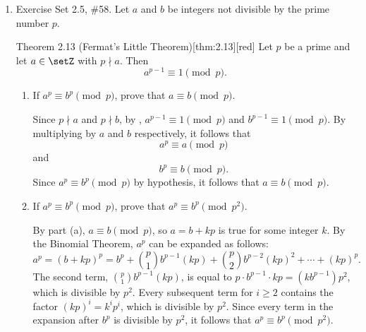 \begin{enumerate}
  \item Exercise Set 2.5, \#58.
  Let $a$ and $b$ be integers not divisible by the prime number $p$.
  \begin{define}{Theorem 2.13 (Fermat's Little Theorem)}[thm:2.13][red]
  Let $p$ be a prime and let $a\in\setZ$ with $p\nmid a$. Then
  \[
  a^{p-1}\equiv 1\pmod{p}.
  \]
  \end{define}
  \begin{enumerate}
    \item If $a^p \equiv b^p \pmod{p}$, prove that $a \equiv b \pmod{p}$. \label{prob:2.5.58a}
    \begin{subprove}
      Since $p \nmid a$ and $p \nmid b$, by , 
      $a^{p-1} \equiv 1 \pmod{p}$ and $b^{p-1} \equiv 1 \pmod{p}$. 
      By multiplying by $a$ and $b$ respectively, it follows that $$a^p \equiv a \pmod{p}$$ and $$b^p \equiv b \pmod{p}.$$
      Since $a^p \equiv b^p \pmod{p}$ by hypothesis, it follows that $a \equiv b \pmod{p}$.
    \end{subprove}
    \item If $a^p \equiv b^p \pmod{p}$, prove that $a^p \equiv b^p \pmod{p^2}$.
    \begin{subprove}
    By part (a), $a \equiv b \pmod{p}$, so $a = b + kp$ is true for some integer $k$. 
    By the Binomial Theorem, $a^p$ can be expanded as follows:
    \[
      a^p = (b + kp)^p = b^p + \binom{p}{1}b^{p-1}(kp) + \binom{p}{2}b^{p-2}(kp)^2 + \cdots + (kp)^p.
    \]
    The second term, $\binom{p}{1}b^{p-1}(kp)$, is equal to $p \cdot b^{p-1} \cdot kp = (kb^{p-1})p^2$, which is divisible by $p^2$. 
    Every subsequent term for $i \ge 2$ contains the factor $(kp)^i = k^i p^i$, which is divisible by $p^2$. 
    Since every term in the expansion after $b^p$ is divisible by $p^2$, it follows that $a^p \equiv b^p \pmod{p^2}$.
    \end{subprove}
  \end{enumerate}


\end{enumerate}
